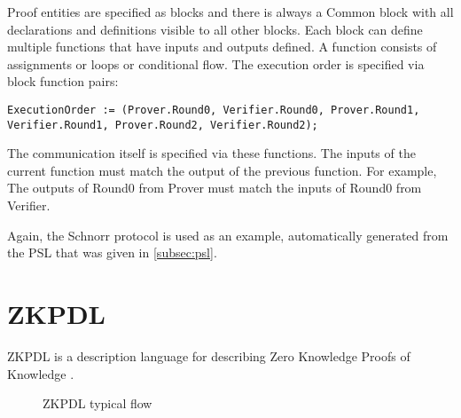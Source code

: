 Proof entities are specified as blocks and there is always a Common
block with all declarations and definitions visible to all other
blocks. Each block can define multiple functions that have inputs and outputs
defined. A function consists of assignments or loops or conditional
flow. The execution order is specified via block function pairs:
\begin{lstlisting}[language=PIL]
ExecutionOrder := (Prover.Round0, Verifier.Round0, Prover.Round1, Verifier.Round1, Prover.Round2, Verifier.Round2);
\end{lstlisting}
The communication itself is specified via these functions. The inputs
of the current function must match the output of the previous
function. For example, The outputs of Round0 from Prover must match
the inputs of Round0 from Verifier.

\filbreak

Again, the Schnorr protocol is used as an example, automatically generated
from the PSL that was given in \ref{subsec:psl}.


\filbreak

\section{ZKPDL}

ZKPDL is a description language for describing Zero Knowledge Proofs
of Knowledge \cite{zkpdl}.

\begin{figure}[hbt!]
  \centering
  \caption{ZKPDL typical flow \cite{zkpdl}}
  \label{fig:zkpdl_flow}
\end{figure}

